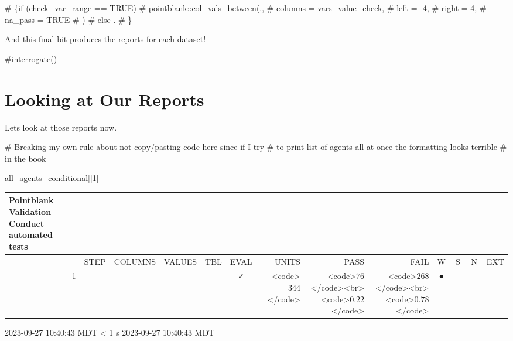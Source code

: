 \documentclass[
  letterpaper,
  DIV=11,
  numbers=noendperiod]{scrreprt}
\newenvironment{Shaded}{\begin{snugshade}}{\end{snugshade}}
\newcommand{\CommentTok}[1]{\textcolor[rgb]{0.37,0.37,0.37}{#1}}
\newcommand{\DecValTok}[1]{\textcolor[rgb]{0.68,0.00,0.00}{#1}}
\newcommand{\NormalTok}[1]{\textcolor[rgb]{0.00,0.23,0.31}{#1}}
\begin{document}
\begin{Shaded}
\begin{Highlighting}[]
\CommentTok{\# \{if (check\_var\_range == TRUE)}
\CommentTok{\#         pointblank::col\_vals\_between(.,}
\CommentTok{\#           columns = vars\_value\_check,}
\CommentTok{\#           left = {-}4,}
\CommentTok{\#           right = 4,}
\CommentTok{\#           na\_pass = TRUE}
\CommentTok{\#         )}
\CommentTok{\#         else .}
\CommentTok{\#         \}}
\end{Highlighting}
\end{Shaded}

And this final bit produces the reports for each dataset!

\begin{Shaded}
\begin{Highlighting}[]
\CommentTok{\#interrogate()}
\end{Highlighting}
\end{Shaded}

\hypertarget{looking-at-our-reports}{%
\section{Looking at Our Reports}\label{looking-at-our-reports}}

Lets look at those reports now.

\begin{Shaded}
\begin{Highlighting}[]
\CommentTok{\# Breaking my own rule about not copy/pasting code here since if I try }
\CommentTok{\# to print list of agents all at once the formatting looks terrible }
\CommentTok{\# in the book}

\NormalTok{all\_agents\_conditional[[}\DecValTok{1}\NormalTok{]]}
\end{Highlighting}
\end{Shaded}

\setlength{\LTpost}{0mm}
\begin{longtable}{lrlllccrrrcccc}
\caption*{
{\large Pointblank Validation} \\ 
{\small Conduct automated tests}
} \\ 
\toprule
 &  & STEP & COLUMNS & VALUES & TBL & EVAL & UNITS & PASS & FAIL & W & S & N & EXT \\ 
\midrule
 & 1 &  &  & — &                                                              & ✓ & <code>$344$</code> & <code>$76$</code><br><code>$0.22$</code> & <code>$268$</code><br><code>$0.78$</code> & ● & --- & --- &  \\ 
\bottomrule
\end{longtable}
\begin{minipage}{\linewidth}
2023-09-27 10:40:43 MDT
\textless{} 1 s
2023-09-27 10:40:43 MDT\\
\end{minipage}
\end{document}
